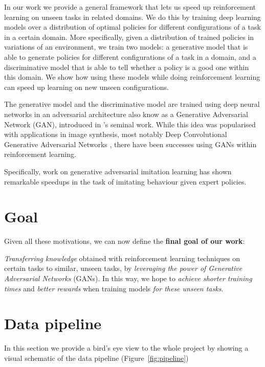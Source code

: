 In our work we provide a general framework that lets us speed up reinforcement learning on unseen tasks in related domains. We do this by training deep learning models over a distribution of optimal policies for different configurations of a task in a certain domain. More specifically, given a distribution of trained policies in variations of an environment, we train two models: a generative model that is able to generate policies for different configurations of a task in a domain, and a discriminative model that is able to tell whether a policy is a good one within this domain. We show how using these models while doing reinforcement learning can speed up learning on new unseen configurations.

The generative model and the discriminative model are trained using deep neural networks in an adversarial architecture also know as a Generative Adversarial Network (GAN), introduced in \cite{goodfellow2014generative}'s seminal work. While this idea was popularised with applications in image synthesis, most notably Deep Convolutional Generative Adversarial Networks \parencite{radford2015unsupervised}, there have been successes using GANs within reinforcement learning.

Specifically, work on generative adversarial imitation learning \parencite{ho2016generative} has shown remarkable speedups in the task of imitating behaviour given expert policies.

\section{Goal}
\label{goal}
Given all these motivations, we can now define the \textbf{final goal of our work}: \\

\begin{addmargin}[3em]{3em}
\emph{Transferring knowledge} obtained with reinforcement learning techniques on certain tasks to similar, unseen tasks, by \emph{leveraging the power of Generative Adversarial Networks} (GANs). In this way, we hope to \emph{achieve shorter training times} and \emph{better rewards} when training models \emph{for these unseen tasks}.
\end{addmargin}


\section{Data pipeline}
In this section we provide a bird's eye view to the whole project by showing a visual schematic of the data pipeline (Figure~\ref{fig:pipeline})

